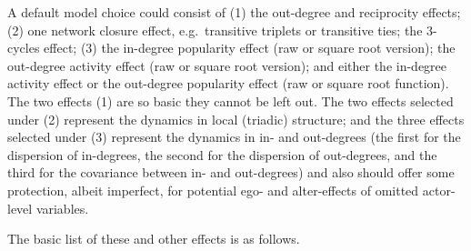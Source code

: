 \documentclass[a4paper,fleqn]{article}
\newcommand{\+}{\, + \,}
\begin{document}
{A default model choice could consist of (1) the out-degree and reciprocity
effects; (2) one network closure effect,
e.g.\ transitive triplets or transitive ties; the 3-cycles effect;
(3) the in-degree popularity effect (raw or square root version);
the out-degree activity effect (raw or square root version);
and either the in-degree activity effect or the out-degree popularity effect
(raw or square root function).
The two effects (1) are so basic they cannot be left out.
The two effects selected under (2) represent the dynamics in local (triadic) structure;
and the three effects selected under (3) represent the dynamics
in in- and out-degrees (the first for the dispersion of in-degrees,
the second for the dispersion of out-degrees, and the third for the
covariance between in- and out-degrees) and also should offer
some protection, albeit imperfect, for potential ego- and alter-effects
of omitted actor-level variables.

The basic list of these and other effects is as follows.

}
\end{document}
